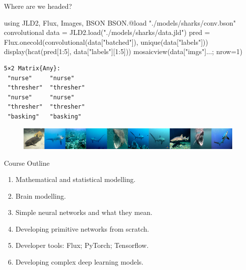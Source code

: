 \documentclass[
  ignorenonframetext,
]{beamer}
\newenvironment{Shaded}{\begin{snugshade}}{\end{snugshade}}
\newcommand{\BuiltInTok}[1]{\textcolor[rgb]{0.00,0.23,0.31}{#1}}
\newcommand{\FloatTok}[1]{\textcolor[rgb]{0.68,0.00,0.00}{#1}}
\newcommand{\FunctionTok}[1]{\textcolor[rgb]{0.28,0.35,0.67}{#1}}
\newcommand{\ImportTok}[1]{\textcolor[rgb]{0.00,0.46,0.62}{#1}}
\newcommand{\NormalTok}[1]{\textcolor[rgb]{0.00,0.23,0.31}{#1}}
\newcommand{\OperatorTok}[1]{\textcolor[rgb]{0.37,0.37,0.37}{#1}}
\newcommand{\PreprocessorTok}[1]{\textcolor[rgb]{0.68,0.00,0.00}{#1}}
\newcommand{\StringTok}[1]{\textcolor[rgb]{0.13,0.47,0.30}{#1}}
\providecommand{\tightlist}{%
  \setlength{\itemsep}{0pt}\setlength{\parskip}{0pt}}\usepackage{longtable,booktabs,array}
\begin{document}
\begin{frame}[fragile]{Where are we headed?}
\protect\hypertarget{where-are-we-headed}{}
\begin{Shaded}
\begin{Highlighting}[]
\ImportTok{using} \BuiltInTok{JLD2}\NormalTok{, }\BuiltInTok{Flux}\NormalTok{, }\BuiltInTok{Images}\NormalTok{, }\BuiltInTok{BSON}
\NormalTok{BSON.}\PreprocessorTok{@load} \StringTok{"./models/sharks/conv.bson"}\NormalTok{ convolutional}
\NormalTok{data }\OperatorTok{=}\NormalTok{ JLD2.}\FunctionTok{load}\NormalTok{(}\StringTok{"./models/sharks/data.jld"}\NormalTok{)}
\NormalTok{pred }\OperatorTok{=}\NormalTok{ Flux.}\FunctionTok{onecold}\NormalTok{(}\FunctionTok{convolutional}\NormalTok{(data[}\StringTok{"batched"}\NormalTok{]), }\FunctionTok{unique}\NormalTok{(data[}\StringTok{"labels"}\NormalTok{]))}
\FunctionTok{display}\NormalTok{(}\FunctionTok{hcat}\NormalTok{(pred[}\FloatTok{1}\OperatorTok{:}\FloatTok{5}\NormalTok{], data[}\StringTok{"labels"}\NormalTok{][}\FloatTok{1}\OperatorTok{:}\FloatTok{5}\NormalTok{]))}
\FunctionTok{mosaicview}\NormalTok{(data[}\StringTok{"imgs"}\NormalTok{]}\OperatorTok{...}\NormalTok{; nrow}\OperatorTok{=}\FloatTok{1}\NormalTok{)}
\end{Highlighting}
\end{Shaded}

\begin{verbatim}
5×2 Matrix{Any}:
 "nurse"     "nurse"
 "thresher"  "thresher"
 "nurse"     "nurse"
 "thresher"  "thresher"
 "basking"   "basking"
\end{verbatim}

\begin{figure}[H]

{\centering \includegraphics{lecture1_files/figure-beamer/cell-2-output-2.png}

}

\end{figure}
\end{frame}

\begin{frame}{Course Outline}
\protect\hypertarget{course-outline}{}
\begin{enumerate}
\tightlist
\item
  Mathematical and statistical modelling.
\item
  Brain modelling.
\item
  Simple neural networks and what they mean.
\item
  Developing primitive networks from scratch.
\item
  Developer tools: Flux; PyTorch; Tensorflow.
\item
  Developing complex deep learning models.
\end{enumerate}
\end{frame}
\end{document}
